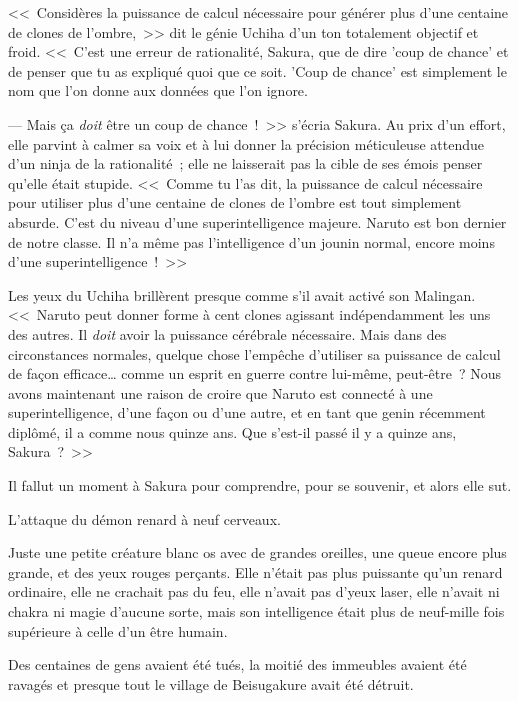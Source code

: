 \clearpage
{}

<<~Considères la puissance de calcul nécessaire pour générer plus d'une centaine de clones de l'ombre,~>> dit le génie Uchiha d'un ton totalement objectif et froid. <<~C'est une erreur de rationalité, Sakura, que de dire 'coup de chance' et de penser que tu as expliqué quoi que ce soit. 'Coup de chance' est simplement le nom que l'on donne aux données que l'on ignore.

--- Mais ça \emph{doit} être un coup de chance~!~>> s'écria Sakura. Au prix d'un effort, elle parvint à calmer sa voix et à lui donner la précision méticuleuse attendue d'un ninja de la rationalité~; elle ne laisserait pas la cible de ses émois penser qu'elle était stupide. <<~Comme tu l'as dit, la puissance de calcul nécessaire pour utiliser plus d'une centaine de clones de l'ombre est tout simplement absurde. C'est du niveau d'une superintelligence majeure. Naruto est bon dernier de notre classe. Il n'a même pas l'intelligence d'un jounin normal, encore moins d'une superintelligence~!~>>

Les yeux du Uchiha brillèrent presque comme s'il avait activé son Malingan. <<~Naruto peut donner forme à cent clones agissant indépendamment les uns des autres. Il \emph{doit} avoir la puissance cérébrale nécessaire. Mais dans des circonstances normales, quelque chose l'empêche d'utiliser sa puissance de calcul de façon efficace… comme un esprit en guerre contre lui-même, peut-être~? Nous avons maintenant une raison de croire que Naruto est connecté à une superintelligence, d'une façon ou d'une autre, et en tant que genin récemment diplômé, il a comme nous quinze ans. Que s'est-il passé il y a quinze ans, Sakura~?~>>

Il fallut un moment à Sakura pour comprendre, pour se souvenir, et alors elle sut.

L'attaque du démon renard à neuf cerveaux.

Juste une petite créature blanc os avec de grandes oreilles, une queue encore plus grande, et des yeux rouges perçants. Elle n'était pas plus puissante qu'un renard ordinaire, elle ne crachait pas du feu, elle n'avait pas d'yeux laser, elle n'avait ni chakra ni magie d'aucune sorte, mais son intelligence était plus de neuf-mille fois supérieure à celle d'un être humain.

Des centaines de gens avaient été tués, la moitié des immeubles avaient été ravagés et presque tout le village de Beisugakure avait été détruit.

